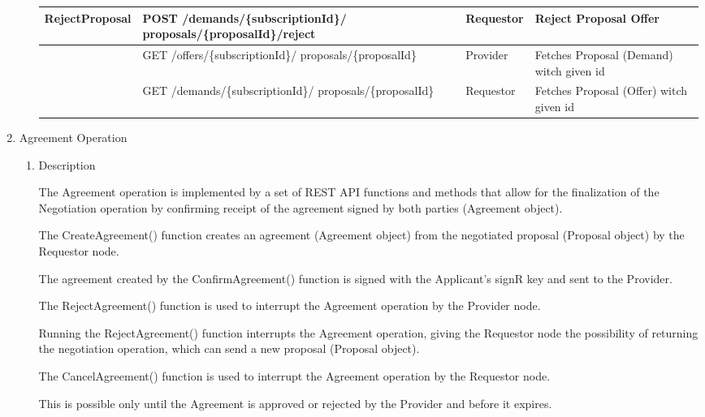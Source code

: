 \begin{enumerate}
\begin{enumerate}
\begin{center}
\begin{tabular}{|p{3cm}|p{7cm}|p{1.5cm}|p{4cm}|}
RejectProposal	&	POST /demands/\{subscriptionId\}/ \newline proposals/\{proposalId\}/reject & Requestor & Reject Proposal Offer \\
\hline

				&	GET /offers/\{subscriptionId\}/ \newline proposals/\{proposalId\}	&	Provider	&	Fetches Proposal (Demand) witch given id \\
\hline

				&	GET /demands/\{subscriptionId\}/ \newline proposals/\{proposalId\}	&	Requestor	&	Fetches Proposal (Offer) witch given id \\
\hline

\end{tabular}
\end{center}

\end{enumerate}


\item  Agreement Operation

\begin{enumerate}

\item Description

The Agreement operation is implemented by a set of REST API functions and methods that allow for the finalization of the Negotiation operation by
confirming receipt of the agreement signed by both parties (Agreement object).

The CreateAgreement() function creates an agreement (Agreement object) from the negotiated proposal (Proposal object) by the Requestor node.

The agreement created by the ConfirmAgreement() function is signed with the Applicant's signR key and sent to the Provider.

The RejectAgreement() function is used to interrupt the Agreement operation by the Provider node.

Running the RejectAgreement() function interrupts the Agreement operation, giving the Requestor node the possibility of returning the negotiation operation,
which can send a new proposal (Proposal object).

The CancelAgreement() function is used to interrupt the Agreement operation by the Requestor node.

This is possible only until the Agreement is approved or rejected by the Provider and before it expires.


\end{enumerate}
\end{enumerate}
